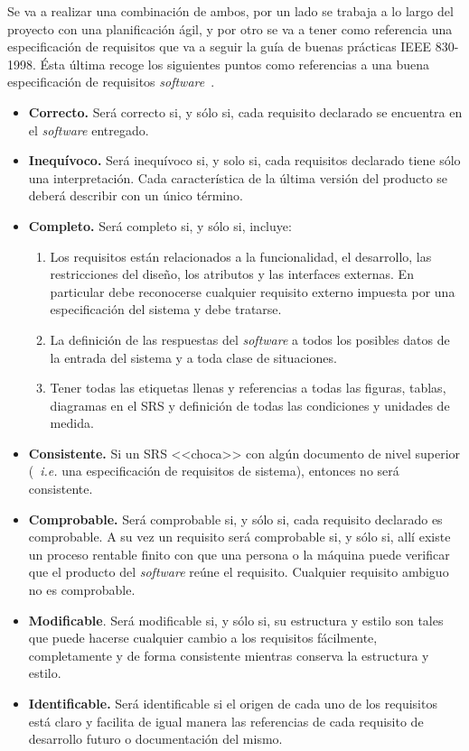 Se va a realizar una combinación de ambos, por un lado se trabaja a lo largo del proyecto con una planificación ágil, y por otro se va a tener como referencia una especificación de requisitos que va a seguir la guía de buenas prácticas IEEE 830-1998. Ésta última recoge los siguientes puntos como referencias a una buena especificación de requisitos \textit{software}~\cite{ingenieriasoftwareytiemporeal_2020}.
\begin{itemize}
\item \textbf{Correcto.} Será correcto si, y sólo si, cada requisito declarado se encuentra en el \textit{software} entregado.
\item \textbf{Inequívoco.} Será inequívoco si, y solo si, cada requisitos declarado tiene sólo una interpretación. Cada característica de la última versión del producto se deberá describir con un único término.
\item \textbf{Completo.} Será completo si, y sólo si, incluye:
\begin{enumerate}
\item Los requisitos están relacionados a la funcionalidad, el desarrollo, las restricciones del diseño, los atributos y las interfaces externas. En particular debe reconocerse cualquier requisito externo impuesta por una especificación del sistema y debe tratarse.
\item La definición de las respuestas del \textit{software} a todos los posibles datos de la entrada del sistema y a toda clase de situaciones.
\item Tener todas las etiquetas llenas y referencias a todas las figuras, tablas, diagramas en el SRS y definición de todas las condiciones y unidades de medida.
\end{enumerate}
\item \textbf{Consistente.} Si un SRS <<choca>> con algún documento de nivel superior (~\textit{i.e.} una especificación de requisitos de sistema), entonces no será consistente.
\item \textbf{Comprobable.} Será comprobable si, y sólo si, cada requisito declarado es comprobable. A su vez un requisito será comprobable si, y sólo si, allí existe un proceso rentable finito con que una persona o la máquina puede verificar que el producto del \textit{software} reúne el requisito. Cualquier requisito ambiguo no es comprobable.
\item \textbf{Modificable}. Será modificable si, y sólo si, su estructura y estilo son tales que puede hacerse cualquier cambio a los requisitos fácilmente, completamente y de forma consistente mientras conserva la estructura y estilo.
\item \textbf{Identificable.} Será identificable si el origen de cada uno de los requisitos está claro y facilita de igual manera las referencias de cada requisito de desarrollo futuro o documentación del mismo.
\end{itemize}

